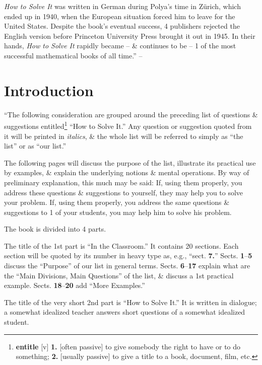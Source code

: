 \documentclass[oneside]{book}
\numberwithin{equation}{section}
\begin{document}
\textit{How to Solve It} was written in German during Polya's time in Z\"urich, which ended up in 1940, when the European situation forced him to leave for the United States. Despite the book's eventual success, 4 publishers rejected the English version before Princeton University Press brought it out in 1945. In their hands, \textit{How to Solve It} rapidly became -- \& continues to be -- 1 of the most successful mathematical books of all time.'' -- \cite[Foreword, pp. xix--xxiv]{Polya2014}

\section*{Introduction}
``The following consideration are grouped around the preceding list of questions \& suggestions entitled\footnote{\textbf{entitle} [v] \textbf{1.} [often passive] to give somebody the right to have or to do something; \textbf{2.} [usually passive] to give a title to a book, document, film, etc.} ``How to Solve It.'' Any question or suggestion quoted from it will be printed in \textit{italics}, \& the whole list will be referred to simply as ``the list'' or as ``our list.''

The following pages will discuss the purpose of the list, illustrate its practical use by examples, \& explain the underlying notions \& mental operations. By way of preliminary explanation, this much may be said: If, using them properly, you address these questions \& suggestions to yourself, they may help you to solve your problem. If, using them properly, you address the same questions \& suggestions to 1 of your students, you may help him to solve his problem.

The book is divided into 4 parts.

The title of the 1st part is ``In the Classroom.'' It contains 20 sections. Each section will be quoted by its number in heavy type as, e.g., ``sect. \textbf{7.}'' Sects. \textbf{1}--\textbf{5} discuss the ``Purpose'' of our list in general terms. Sects. \textbf{6}--\textbf{17} explain what are the ``Main Divisions, Main Questions'' of the list, \& discuss a 1st practical example. Sects. \textbf{18}--\textbf{20} add ``More Examples.''

The title of the very short 2nd part is ``How to Solve It.'' It is written in dialogue; a somewhat idealized teacher answers short questions of a somewhat idealized student.
\end{document}

